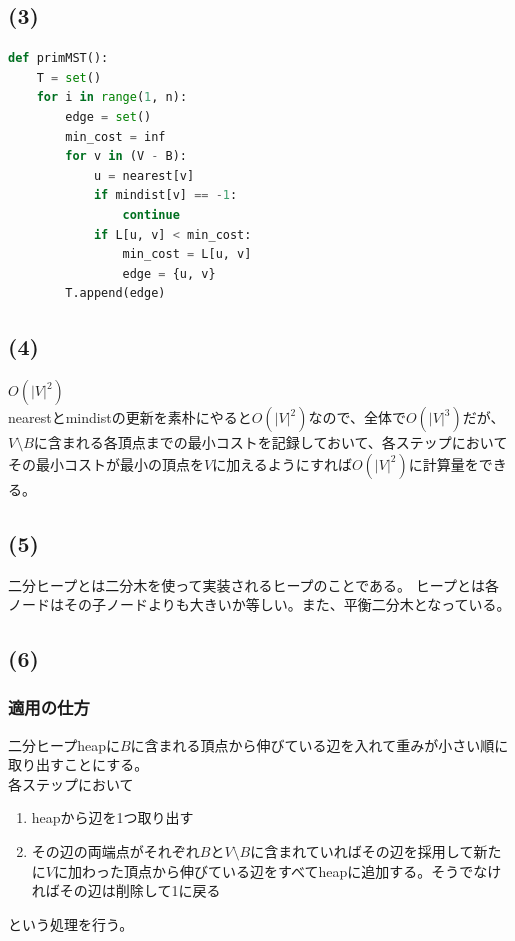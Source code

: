 \documentclass[a4paper,12pt,xelatex,ja=standard]{bxjsarticle}
\begin{document}
\subsection*{(3)}
\begin{lstlisting}[language=Python, caption=プリム法]
def primMST():
    T = set()
    for i in range(1, n):
        edge = set()
        min_cost = inf
        for v in (V - B):
            u = nearest[v]
            if mindist[v] == -1:
                continue
            if L[u, v] < min_cost:
                min_cost = L[u, v]
                edge = {u, v}
        T.append(edge)

\end{lstlisting}

\subsection*{(4)}
$O(|V|^2)$\\
nearestとmindistの更新を素朴にやると$O(|V|^2)$なので、全体で$O(|V|^3)$だが、$V \setminus B$に含まれる各頂点までの最小コストを記録しておいて、各ステップにおいてその最小コストが最小の頂点を$V$に加えるようにすれば$O(|V|^2)$に計算量をできる。

\subsection*{(5)}
二分ヒープとは二分木を使って実装されるヒープのことである。
ヒープとは各ノードはその子ノードよりも大きいか等しい。また、平衡二分木となっている。

\subsection*{(6)}
\subsubsection*{適用の仕方}
二分ヒープheapに$B$に含まれる頂点から伸びている辺を入れて重みが小さい順に取り出すことにする。\\
各ステップにおいて
\begin{enumerate}
  \item heapから辺を1つ取り出す
  \item その辺の両端点がそれぞれ$B$と$V \setminus B$に含まれていればその辺を採用して新たに$V$に加わった頂点から伸びている辺をすべてheapに追加する。そうでなければその辺は削除して1に戻る
\end{enumerate}
という処理を行う。
\end{document}
